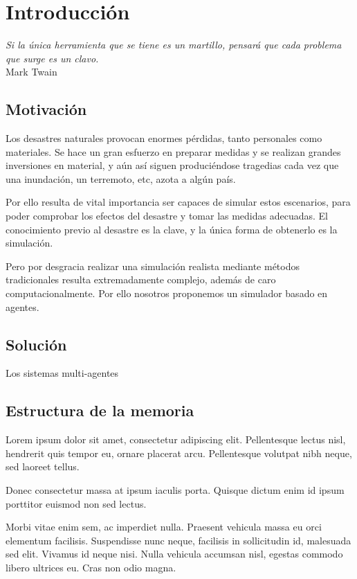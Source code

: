 
\chapter*{Introducción} \label{cap0}


\begin{flushright}
\begin{minipage}{7.85cm}
    {\em Si la única herramienta que se tiene es un martillo, pensará que cada
    problema que surge es un clavo.} \\  Mark Twain
\end{minipage}
\end{flushright}

\vspace*{5mm}

\section*{Motivación}

Los desastres naturales provocan enormes pérdidas, tanto personales como
materiales. Se hace un gran esfuerzo en preparar medidas y se realizan grandes
inversiones en material, y aún así siguen produciéndose tragedias cada vez que
una inundación, un terremoto, etc, azota a algún país.

Por ello resulta de vital importancia ser capaces de simular estos escenarios,
para poder comprobar los efectos del desastre y tomar las medidas adecuadas. El
conocimiento previo al desastre es la clave, y la única forma de obtenerlo es
la simulación.

Pero por desgracia realizar una simulación realista mediante métodos
tradicionales resulta extremadamente complejo, además de caro
computacionalmente. Por ello nosotros proponemos un simulador basado en agentes.

\section*{Solución}

Los sistemas multi-agentes

\section*{Estructura de la memoria}

Lorem ipsum dolor sit amet, consectetur adipiscing elit. Pellentesque lectus
nisl, hendrerit quis tempor eu, ornare placerat arcu. Pellentesque volutpat nibh
neque, sed laoreet tellus.

Donec consectetur massa at ipsum iaculis porta. Quisque dictum enim id ipsum
porttitor euismod non sed lectus.

Morbi vitae enim sem, ac imperdiet nulla. Praesent vehicula massa eu orci
elementum facilisis. Suspendisse nunc neque, facilisis in sollicitudin id,
malesuada sed elit. Vivamus id neque nisi. Nulla vehicula accumsan nisl, egestas
commodo libero ultrices eu. Cras non odio magna.